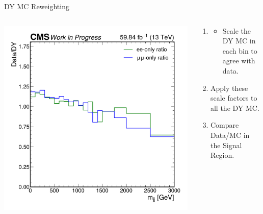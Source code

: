 \documentclass[aspectratio=169]{beamer}
\begin{document}
\begin{frame}{DY MC Reweighting}
  \begin{columns}
    \begin{column}{0.50\textwidth}
      \centering
      \includegraphics[width=\textwidth]{../figures/plots/mass_sf_ratio.pdf}
    \end{column}
    \begin{column}{0.50\textwidth}
        \centering
        \resizebox{0.55\columnwidth}{!}{%
        
        }
        \vfill
      \begin{block}{}
        \begin{enumerate}
          \item {}
          \begin{itemize}
            \item Scale the DY MC in each bin to agree with data. 
          \end{itemize}
          \item Apply these scale factors to all the DY MC.
          \item Compare Data/MC in the Signal Region.
        \end{enumerate}
        
      \end{block}
    \end{column}
  \end{columns}
\end{frame}
\end{document}
